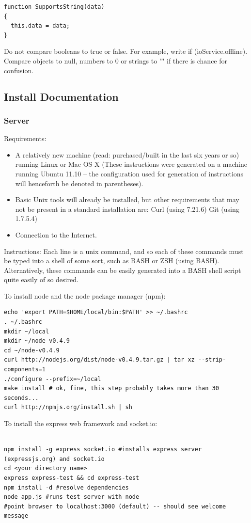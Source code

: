 \documentclass[letterpaper,12pt]{article}
\begin{document}
\begin{verbatim}
function SupportsString(data)
{
  this.data = data;
}
\end{verbatim}
Do not compare booleans to true or false. For example, write if (ioService.offline). Compare objects to null, numbers to 0 or strings to "" if there is chance for confusion.
\subsection{Install Documentation}
\subsubsection{Server}
Requirements:
\begin{itemize}
\item A relatively new machine (read: purchased/built in the last six years or so) running Linux or Mac OS X (These instructions were generated on a machine running Ubuntu 11.10 -- the configuration used for generation of instructions will henceforth be denoted in parentheses).
\item Basic Unix tools will already be installed, but other requirements that may not be present in a standard installation are:
Curl (using 7.21.6)
Git (using 1.7.5.4)
\item Connection to the Internet. 
\end{itemize}
Instructions:
Each line is a unix command, and so each of these commands must be typed into a shell of some sort, such as BASH or ZSH (using BASH). Alternatively, these commands can be easily generated into a BASH shell script quite easily of so desired.

To install node and the node package manager (npm):

\begin{verbatim}
echo 'export PATH=$HOME/local/bin:$PATH' >> ~/.bashrc
. ~/.bashrc
mkdir ~/local
mkdir ~/node-v0.4.9
cd ~/node-v0.4.9
curl http://nodejs.org/dist/node-v0.4.9.tar.gz | tar xz --strip-components=1
./configure --prefix=~/local
make install # ok, fine, this step probably takes more than 30 seconds...
curl http://npmjs.org/install.sh | sh
\end{verbatim}

To install the express web framework and socket.io:

\begin{verbatim}

npm install -g express socket.io #installs express server (expressjs.org) and socket.io
cd <your directory name>
express express-test && cd express-test
npm install -d #resolve dependencies
node app.js #runs test server with node
#point browser to localhost:3000 (default) -- should see welcome message
\end{verbatim}
\end{document}
